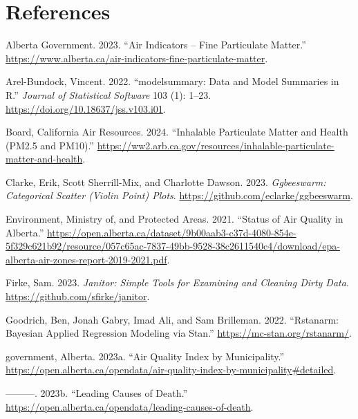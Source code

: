 \documentclass[
  letterpaper,
  DIV=11,
  numbers=noendperiod]{scrartcl}
\newlength{\cslhangindent}
\newenvironment{CSLReferences}[2] %
 {\begin{list}{}{%
  \setlength{\itemindent}{0pt}
  \setlength{\leftmargin}{0pt}
  \setlength{\parsep}{0pt}
  \ifodd #1
   \setlength{\leftmargin}{\cslhangindent}
   \setlength{\itemindent}{-1\cslhangindent}
  \fi
  \setlength{\itemsep}{#2\baselineskip}}}
 {\end{list}}
\begin{document}
\newpage

\section*{References}\label{references}

\label{refs}
\begin{CSLReferences}{1}{0}
Alberta Government. 2023. {``Air Indicators -- Fine Particulate
Matter.''}
\url{https://www.alberta.ca/air-indicators-fine-particulate-matter}.

Arel-Bundock, Vincent. 2022. {``{modelsummary}: Data and Model Summaries
in {R}.''} \emph{Journal of Statistical Software} 103 (1): 1--23.
\url{https://doi.org/10.18637/jss.v103.i01}.

Board, California Air Resources. 2024. {``Inhalable Particulate Matter
and Health (PM2.5 and PM10).''}
\url{https://ww2.arb.ca.gov/resources/inhalable-particulate-matter-and-health}.

Clarke, Erik, Scott Sherrill-Mix, and Charlotte Dawson. 2023.
\emph{Ggbeeswarm: Categorical Scatter (Violin Point) Plots}.
\url{https://github.com/eclarke/ggbeeswarm}.

Environment, Ministry of, and Protected Areas. 2021. {``Status of Air
Quality in Alberta.''}
\url{https://open.alberta.ca/dataset/9b00aab3-c37d-4080-854e-5f329c621b92/resource/057c65ac-7837-49bb-9528-38c2611540c4/download/epa-alberta-air-zones-report-2019-2021.pdf}.

Firke, Sam. 2023. \emph{Janitor: Simple Tools for Examining and Cleaning
Dirty Data}. \url{https://github.com/sfirke/janitor}.

Goodrich, Ben, Jonah Gabry, Imad Ali, and Sam Brilleman. 2022.
{``Rstanarm: {Bayesian} Applied Regression Modeling via {Stan}.''}
\url{https://mc-stan.org/rstanarm/}.

government, Alberta. 2023a. {``Air Quality Index by Municipality.''}
\url{https://open.alberta.ca/opendata/air-quality-index-by-municipality\#detailed}.

---------. 2023b. {``Leading Causes of Death.''}
\url{https://open.alberta.ca/opendata/leading-causes-of-death}.


\end{CSLReferences}
\end{document}

